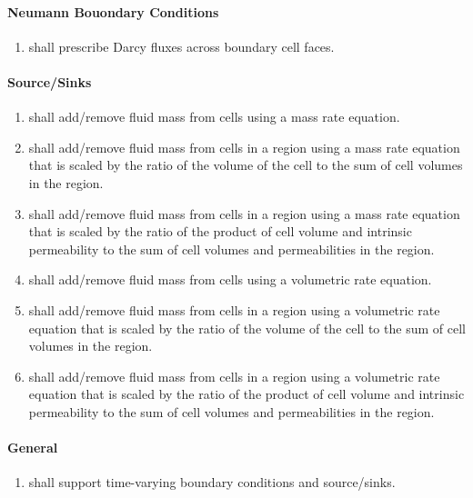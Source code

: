 \paragraph{Neumann Bouondary Conditions}
\begin{enumerate}[resume]
	\item \label{fluidNeumannBC} \pft shall prescribe Darcy fluxes across boundary cell faces.
\end{enumerate}

\paragraph{Source/Sinks}
\begin{enumerate}[label=FR \arabic*.,ref=FR \arabic*,nosep, resume]
	\item \label{fluidMassRateSS} \pft shall add/remove fluid mass from cells using a mass rate equation.
	\item \label{fluidScaledMassRateVolSS} \pft shall add/remove fluid mass from cells in a region using a mass rate equation that is scaled by the ratio of the volume of the cell to the sum of cell volumes in the region.
	\item \label{fluidScaledMassRatePermSS} \pft shall add/remove fluid mass from cells in a region using a mass rate equation that is scaled by the ratio of the product of cell volume and intrinsic permeability to the sum of cell volumes and permeabilities in the region.
	\item \label{fluidVolRateSS} \pft shall add/remove fluid mass from cells using a volumetric rate equation.
	\item \label{fluidScaledVolRateVolSS} \pft shall add/remove fluid mass from cells in a region using a volumetric rate equation that is scaled by the ratio of the volume of the cell to the sum of cell volumes in the region.
	\item \label{fluidScaledVolRatePermSS} \pft shall add/remove fluid mass from cells in a region using a volumetric rate equation that is scaled by the ratio of the product of cell volume and intrinsic permeability to the sum of cell volumes and permeabilities in the region.
\end{enumerate}

\paragraph{General}
\begin{enumerate}[resume]
    \item \label{FRvaryTime} \pft shall support time-varying boundary conditions and source/sinks.
\end{enumerate}

